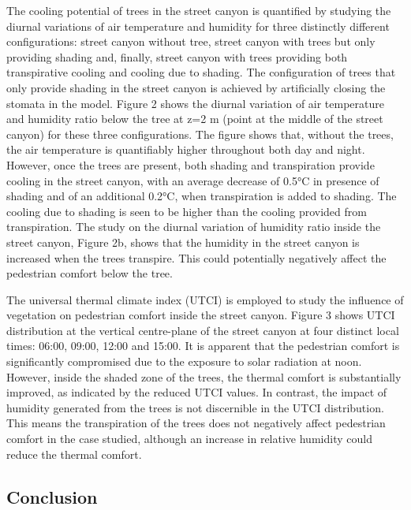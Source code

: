 The cooling potential of trees in the street canyon is quantified by studying the diurnal variations of air temperature and humidity for three distinctly different configurations: street canyon without tree, street canyon with trees but only providing shading and, finally, street canyon with trees providing both transpirative cooling and cooling due to shading. The configuration of trees that only provide shading in the street canyon is achieved by artificially closing the stomata in the model. Figure 2 shows the diurnal variation of air temperature and humidity ratio below the tree at z=2 m (point at the middle of the street canyon) for these three configurations. The figure shows that, without the trees, the air temperature is quantifiably higher throughout both day and night. However, once the trees are present, both shading and transpiration provide cooling in the street canyon, with an average decrease of 0.5°C in presence of shading and of an additional 0.2°C, when transpiration is added to shading. The cooling due to shading is seen to be higher than the cooling provided from transpiration. The study on the diurnal variation of humidity ratio inside the street canyon, Figure 2b, shows that the humidity in the street canyon is increased when the trees transpire. This could potentially negatively affect the pedestrian comfort below the tree. 

The universal thermal climate index (UTCI) is employed to study the influence of vegetation on pedestrian comfort inside the street canyon. Figure 3 shows UTCI distribution at the vertical centre-plane of the street canyon at four distinct local times: 06:00, 09:00, 12:00 and 15:00. It is apparent that the pedestrian comfort is significantly compromised due to the exposure to solar radiation at noon. However, inside the shaded zone of the trees, the thermal comfort is substantially improved, as indicated by the reduced UTCI values. In contrast, the impact of humidity generated from the trees is not discernible in the UTCI distribution. This means the transpiration of the trees does not negatively affect pedestrian comfort in the case studied, although an increase in relative humidity could reduce the thermal comfort.

\subsection{Conclusion}

